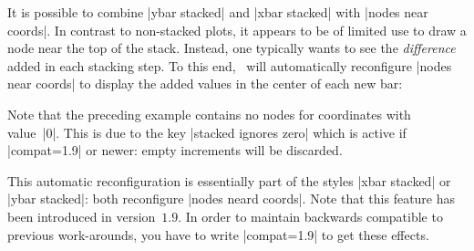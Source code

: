 {It is possible to combine |ybar stacked| and |xbar stacked| with |nodes near coords|. In contrast to non-stacked plots, it appears to be of limited use to draw a node near the top of the stack. Instead, one typically wants to see the \emph{difference} added in each stacking step. To this end, \PGFPlots\ will automatically reconfigure |nodes near coords| to display the added values in the center of each new bar:

\begin{codeexample}[]
\end{codeexample}

\begin{codeexample}[]
\end{codeexample}

Note that the preceding example contains no nodes for coordinates with value~|0|. This is due to the key |stacked ignores zero| which is active if |compat=1.9| or newer: empty increments will be discarded.

This automatic reconfiguration is essentially part of the styles |xbar stacked| or |ybar stacked|: both reconfigure |nodes neard coords|. Note that this feature has been introduced in version~$1.9$. In order to maintain backwards compatible to previous work-arounds, you have to write |compat=1.9| to get these effects.

}
